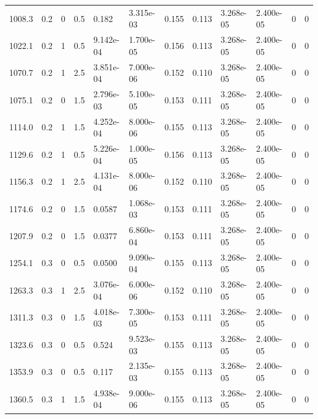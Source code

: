 \documentclass[preview]{standalone}
\begin{document}
{{\begin{tabular}{L{1.2cm}C{1.2cm} C{0.3cm}C{0.5cm} C{1.4cm}C{1.4cm} C{1.4cm}C{1.4cm} C{1.6cm}C{1.6cm} C{1.6cm}C{1.6cm}}
  1008.3  &   0.2  & 0     & 0.5 &  0.182  & 3.315e-03  &  0.155&   0.113& 3.268e-05 & 2.400e-05   &  0 & 0  \\ 
  1022.1  &   0.2  & 1     & 0.5 &  9.142e-04  & 1.700e-05  &  0.156&   0.113& 3.268e-05 & 2.400e-05   &  0 & 0  \\ 
  1070.7  &   0.2  & 1     & 2.5 &  3.851e-04  & 7.000e-06  &  0.152&   0.110& 3.268e-05 & 2.400e-05   &  0 & 0  \\ 
  1075.1  &   0.2  & 0     & 1.5 &  2.796e-03  & 5.100e-05  &  0.153&   0.111& 3.268e-05 & 2.400e-05   &  0 & 0  \\ 
  1114.0  &   0.2  & 1     & 1.5 &  4.252e-04  & 8.000e-06  &  0.155&   0.113& 3.268e-05 & 2.400e-05   &  0 & 0  \\ 
  1129.6  &   0.2  & 1     & 0.5 &  5.226e-04  & 1.000e-05  &  0.156&   0.113& 3.268e-05 & 2.400e-05   &  0 & 0  \\ 
  1156.3  &   0.2  & 1     & 2.5 &  4.131e-04  & 8.000e-06  &  0.152&   0.110& 3.268e-05 & 2.400e-05   &  0 & 0  \\ 
  1174.6  &   0.2  & 0     & 1.5 &  0.0587  & 1.068e-03  &  0.153&   0.111& 3.268e-05 & 2.400e-05   &  0 & 0  \\ 
  1207.9  &   0.2  & 0     & 1.5 &  0.0377  & 6.860e-04  &  0.153&   0.111& 3.268e-05 & 2.400e-05   &  0 & 0  \\ 
  1254.1  &   0.3  & 0     & 0.5 &  0.0500  & 9.090e-04  &  0.155&   0.113& 3.268e-05 & 2.400e-05   &  0 & 0  \\ 
  1263.3  &   0.3  & 1     & 2.5 &  3.076e-04  & 6.000e-06  &  0.152&   0.110& 3.268e-05 & 2.400e-05   &  0 & 0  \\ 
  1311.3  &   0.3  & 0     & 1.5 &  4.018e-03  & 7.300e-05  &  0.153&   0.111& 3.268e-05 & 2.400e-05   &  0 & 0  \\ 
  1323.6  &   0.3  & 0     & 0.5 &  0.524  & 9.523e-03  &  0.155&   0.113& 3.268e-05 & 2.400e-05   &  0 & 0  \\ 
  1353.9  &   0.3  & 0     & 0.5 &  0.117  & 2.135e-03  &  0.155&   0.113& 3.268e-05 & 2.400e-05   &  0 & 0  \\ 
  1360.5  &   0.3  & 1     & 1.5 &  4.938e-04  & 9.000e-06  &  0.155&   0.113& 3.268e-05 & 2.400e-05   &  0 & 0  \\ 
\hline 
\end{tabular} 

}}
\end{document}
